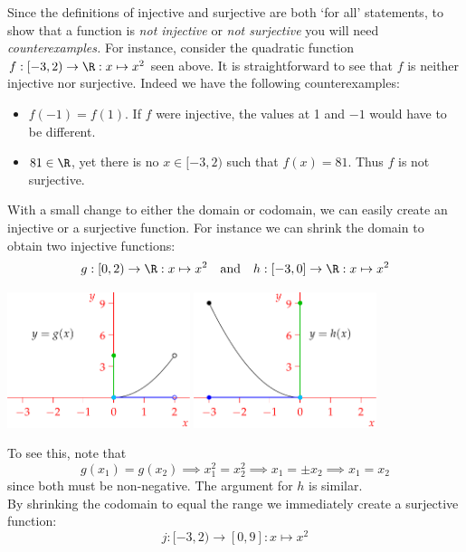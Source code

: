 \noindent Since the definitions of injective and surjective are both `for all' statements, to show that a function is \emph{not injective} or \emph{not surjective} you will need \emph{counterexamples.} For instance, consider the quadratic function $f:[-3,2)\to\R:x\mapsto x^2$ seen above. It is straightforward to see that $f$ is neither injective nor surjective. Indeed we have the following counterexamples:
		\begin{itemize}%
  	  \item $f(-1)=f(1)$. If $f$ were injective, the values at 1 and $-1$ would have to be different.
  	  \item $81\in\R$, yet there is no $x\in[-3,2)$ such that $f(x)=81$. Thus $f$ is not surjective.
		\end{itemize}
With a small change to either the domain or codomain, we can easily create an injective or a surjective function. For instance we can shrink the domain to obtain two injective functions:
\[g:[0,2)\to\R:x\mapsto x^2\quad\text{and}\quad h:[-3,0]\to\R:x\mapsto x^2\]
\begin{center}
\includegraphics[width=0.4\textwidth]{sets-18-rangedom2}
\qquad\qquad\qquad
\includegraphics[width=0.4\textwidth]{sets-19-rangedom3}
\end{center}
To see this, note that
\[g(x_1)=g(x_2)\implies x_1^2=x_2^2\implies x_1=\pm x_2\implies x_1=x_2\]
since both must be non-negative. The argument for $h$ is similar.\\
By shrinking the codomain to equal the range we immediately create a surjective function:
\[j:[-3,2)\to [0,9]:x\mapsto x^2\]


